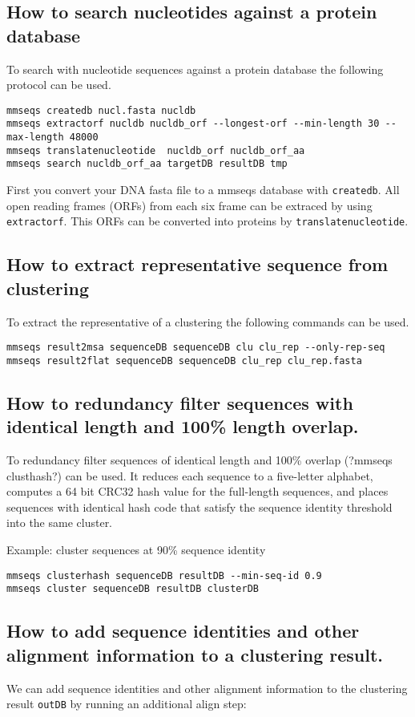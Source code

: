 \documentclass[11pt,a4paper]{scrreprt}
\begin{document}
\subsection{How to search nucleotides against a protein database}
To search with nucleotide sequences against a protein database the following protocol can be used. 
\begin{verbatim}
mmseqs createdb nucl.fasta nucldb
mmseqs extractorf nucldb nucldb_orf --longest-orf --min-length 30 --max-length 48000
mmseqs translatenucleotide  nucldb_orf nucldb_orf_aa
mmseqs search nucldb_orf_aa targetDB resultDB tmp 
\end{verbatim}

First you convert your DNA fasta file to a mmseqs database with \texttt{createdb}. All open reading frames (ORFs) from each six frame can be extraced by using \texttt{extractorf}.
This ORFs can be converted into proteins by \texttt{translatenucleotide}. 

\subsection{How to extract representative sequence from clustering}
To extract the representative of a clustering the following commands can be used. 
\begin{verbatim}
mmseqs result2msa sequenceDB sequenceDB clu clu_rep --only-rep-seq
mmseqs result2flat sequenceDB sequenceDB clu_rep clu_rep.fasta
\end{verbatim}

\subsection{How to redundancy filter sequences with identical length and 100\% length overlap.}
To redundancy filter sequences of identical length and 100\% overlap (?mmseqs clusthash?) can be used. It reduces each sequence to a five-letter alphabet, computes a 64 bit CRC32 hash value for the full-length sequences, and places sequences with identical hash code that satisfy the sequence identity threshold into the same cluster. 

Example: cluster sequences at 90\% sequence identity 
\begin{verbatim}
mmseqs clusterhash sequenceDB resultDB --min-seq-id 0.9
mmseqs cluster sequenceDB resultDB clusterDB
\end{verbatim}

\subsection{How to add sequence identities and other alignment information to a clustering result.}
We can add sequence identities and other alignment information to the clustering result \texttt{outDB} by running an additional align step:
\end{document}
